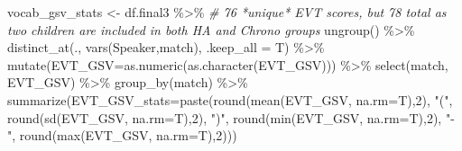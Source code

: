 \documentclass[
]{article}
\newenvironment{Shaded}{\begin{snugshade}}{\end{snugshade}}
\newcommand{\AttributeTok}[1]{\textcolor[rgb]{0.77,0.63,0.00}{#1}}
\newcommand{\CommentTok}[1]{\textcolor[rgb]{0.56,0.35,0.01}{\textit{#1}}}
\newcommand{\DecValTok}[1]{\textcolor[rgb]{0.00,0.00,0.81}{#1}}
\newcommand{\FunctionTok}[1]{\textcolor[rgb]{0.00,0.00,0.00}{#1}}
\newcommand{\NormalTok}[1]{#1}
\newcommand{\OtherTok}[1]{\textcolor[rgb]{0.56,0.35,0.01}{#1}}
\newcommand{\SpecialCharTok}[1]{\textcolor[rgb]{0.00,0.00,0.00}{#1}}
\newcommand{\StringTok}[1]{\textcolor[rgb]{0.31,0.60,0.02}{#1}}
\begin{document}
\begin{Shaded}
\begin{Highlighting}[]
\NormalTok{vocab\_gsv\_stats }\OtherTok{\textless{}{-}}\NormalTok{ df.final3 }\SpecialCharTok{\%\textgreater{}\%} \CommentTok{\# 76 *unique* EVT scores, but 78 total as two children are included in both HA and Chrono groups }
  \FunctionTok{ungroup}\NormalTok{() }\SpecialCharTok{\%\textgreater{}\%}
  \FunctionTok{distinct\_at}\NormalTok{(., }\FunctionTok{vars}\NormalTok{(Speaker,match), }\AttributeTok{.keep\_all =}\NormalTok{ T) }\SpecialCharTok{\%\textgreater{}\%}
  \FunctionTok{mutate}\NormalTok{(}\AttributeTok{EVT\_GSV=}\FunctionTok{as.numeric}\NormalTok{(}\FunctionTok{as.character}\NormalTok{(EVT\_GSV))) }\SpecialCharTok{\%\textgreater{}\%}
  \FunctionTok{select}\NormalTok{(match, EVT\_GSV) }\SpecialCharTok{\%\textgreater{}\%}
  \FunctionTok{group\_by}\NormalTok{(match) }\SpecialCharTok{\%\textgreater{}\%}
  \FunctionTok{summarize}\NormalTok{(}\AttributeTok{EVT\_GSV\_stats=}\FunctionTok{paste}\NormalTok{(}\FunctionTok{round}\NormalTok{(}\FunctionTok{mean}\NormalTok{(EVT\_GSV, }\AttributeTok{na.rm=}\NormalTok{T),}\DecValTok{2}\NormalTok{),}
                                \StringTok{"("}\NormalTok{,}
                                \FunctionTok{round}\NormalTok{(}\FunctionTok{sd}\NormalTok{(EVT\_GSV, }\AttributeTok{na.rm=}\NormalTok{T),}\DecValTok{2}\NormalTok{),}
                                \StringTok{")"}\NormalTok{,}
                                \FunctionTok{round}\NormalTok{(}\FunctionTok{min}\NormalTok{(EVT\_GSV, }\AttributeTok{na.rm=}\NormalTok{T),}\DecValTok{2}\NormalTok{),}
                                \StringTok{"{-}"}\NormalTok{,}
                                \FunctionTok{round}\NormalTok{(}\FunctionTok{max}\NormalTok{(EVT\_GSV, }\AttributeTok{na.rm=}\NormalTok{T),}\DecValTok{2}\NormalTok{)))}


\end{Highlighting}
\end{Shaded}
\end{document}
